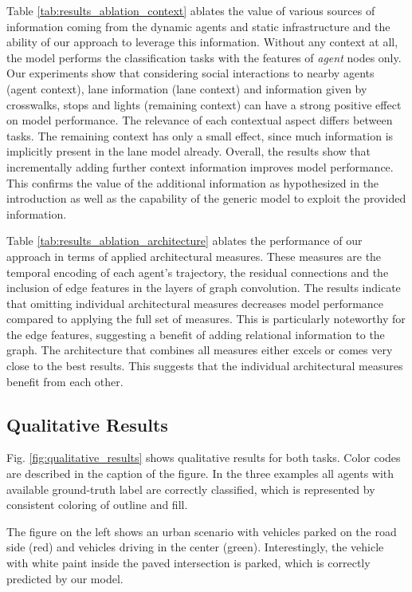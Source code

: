 \documentclass[letterpaper, 10 pt, journal, twoside]{IEEEtran}
\begin{document}
Table \ref{tab:results_ablation_context} ablates the value of various sources of information coming from the dynamic agents and static infrastructure and the ability of our approach to leverage this information.
Without any context at all, the model performs the classification tasks with the features of \textit{agent} nodes only.
Our experiments show that considering social interactions to nearby agents (agent context), lane information (lane context) and information given by crosswalks, stops and lights (remaining context) can have a strong positive effect on model performance.
The relevance of each contextual aspect differs between tasks.
The remaining context has only a small effect, since much information is implicitly present in the lane model already.
Overall, the results show that incrementally adding further context information improves model performance.
This confirms the value of the additional information as hypothesized in the introduction as well as the capability of the generic model to exploit the provided information.

Table \ref{tab:results_ablation_architecture} ablates the performance of our approach in terms of applied architectural measures.
These measures are the temporal encoding of each agent's trajectory, the residual connections and the inclusion of edge features in the layers of graph convolution.
The results indicate that omitting individual architectural measures decreases model performance compared to applying the full set of measures.
This is particularly noteworthy for the edge features, suggesting a benefit of adding relational information to the graph.
The architecture that combines all measures either excels or comes very close to the best results.
This suggests that the individual architectural measures benefit from each other.

\subsection{Qualitative Results}
Fig. \ref{fig:qualitative_results} shows qualitative results for both tasks.
Color codes are described in the caption of the figure.
In the three examples all agents with available ground-truth label are correctly classified, which is represented by consistent coloring of outline and fill.

The figure on the left shows an urban scenario with vehicles parked on the road side (red) and vehicles driving in the center (green).
Interestingly, the vehicle with white paint inside the paved intersection is parked, which is correctly predicted by our model.
\end{document}
